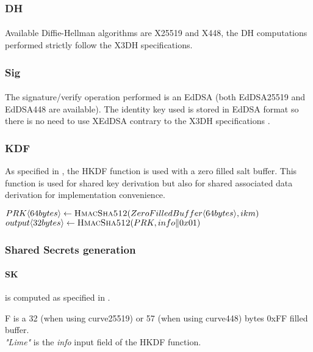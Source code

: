 \documentclass[a4paper,11pt]{article}
\begin{document}
    \subsubsection{DH}
      \paragraph*{}Available Diffie-Hellman algorithms are X25519 and X448, the DH computations performed strictly follow the X3DH specifications.
    \subsubsection{Sig}
      \paragraph*{}The signature/verify operation performed is an EdDSA (both EdDSA25519 and EdDSA448 are available). The identity key used is stored in EdDSA format so there is no need to use XEdDSA contrary to the X3DH specifications \cite[section 2.2]{x3dh}.
    \subsubsection{KDF}
      As specified in \cite[section 2.2]{x3dh}, the HKDF function\cite{rfc5869} is used with a zero filled salt buffer. This function is used for shared key derivation but also for shared associated data derivation for implementation convenience.
      \begin{algorithmic}
        \Statex
          \State $PRK\langle 64bytes\rangle  \gets \Call{HmacSha512}{ZeroFilledBuffer\langle 64bytes\rangle, ikm}$
          \State $output\langle 32bytes\rangle \gets \Call{HmacSha512}{PRK, info\Arrowvert 0x01}$
          \State {}
        \EndFunction
      \end{algorithmic}
    \subsubsection{Shared Secrets generation}
      \paragraph{SK}is computed as specified in \cite[section 3.3 and 2.2]{x3dh}.
        F is a 32 (when using curve25519) or 57 (when using curve448) bytes 0xFF filled buffer.\\
        \textit{"Lime"} is the \textit{info} input field of the HKDF function\cite{rfc5869}.
\end{document}
